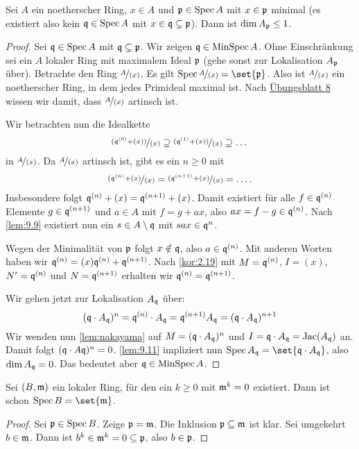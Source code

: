 \documentclass[12pt,a4paper]{scrartcl}
\theoremstyle{cplain}
\theoremstyle{cdef}
\begin{document}
\begin{satz} \label{thm:krulls hauptidealsatz}
	Sei $A$ ein noetherscher Ring, $x\in A$ und $\mathfrak{p}\in\operatorname{Spec} A$ mit $x\in\mathfrak{p}$ minimal (es existiert also kein $\mathfrak{q} \in\operatorname{Spec} A$ mit $x\in\mathfrak{q}\subsetneq \mathfrak{p}$). Dann ist $\dim A_{\mathfrak{p}}\le 1$.
\end{satz}
\begin{proof}
	Sei $\mathfrak{q}\in \operatorname{Spec} A$ mit $\mathfrak{q}\subsetneq \mathfrak{p}$. Wir zeigen $\mathfrak{q}\in \operatorname{MinSpec} A$. Ohne Einschränkung sei ein $A$ lokaler Ring mit maximalem Ideal $\mathfrak{p}$ (gehe sonst zur Lokalisation $A_{\mathfrak{p}}$ über). Betrachte den Ring $\nicefrac{A}{(x)}$. Es gilt $\Spec \fak{A}{(x)} = \set{\fp}$. Also ist $\nicefrac{A}{(x)}$ ein noetherscher Ring, in dem jedes Primideal maximal ist. Nach \href{http://www.math.uni-bonn.de/ag/stroppel/Franzen_Algebra_1_Uebung/Blatt8.pdf}{Übungsblatt 8} wissen wir damit, dass $\nicefrac{A}{(x)}$ artinsch ist.
	
	Wir betrachten nun die Idealkette \[\nicefrac{(\mathfrak{q}^{(0)}+(x))}{(x)} \supseteq \nicefrac{(\mathfrak{q}^{(1)}+(x))}{(x)}\supseteq \dots \] in $\nicefrac{A}{(x)}$. Da $\nicefrac{A}{(x)}$ artinsch ist, gibt es ein $n\ge 0$ mit \[\nicefrac{(\mathfrak{q}^{(n)}+(x)}{(x)} = \nicefrac{(\mathfrak{q}^{(n+1)}+(x)}{(x)} = \dots .\]
	Insbesondere folgt $\mathfrak{q}^{(n)}+(x) = \mathfrak{q}^{(n+1)}+ (x)$. Damit existiert für alle $f \in \mathfrak{q}^{(n)}$ Elemente $g\in \mathfrak{q}^{(n+1)}$ und $a\in A$ mit $f = g+ax$, also $ax = f-g\in \mathfrak{q}^{(n)}$. Nach \cref{lem:9.9} existiert nun ein $s\in A\setminus \mathfrak{q}$ mit $sax\in\mathfrak{q}^n$.
	
	Wegen der Minimalität von $\mathfrak{p}$ folgt $x\notin \mathfrak{q}$, also $a\in\mathfrak{q}^{(n)}$. Mit anderen Worten haben wir $\mathfrak{q}^{(n)} = (x)\mathfrak{q}^{(n)}+ \mathfrak{q}^{(n+1)}$. Nach \cref{kor:2.19} mit $M=\mathfrak{q}^{(n)}$, $I=(x)$, $N'=\mathfrak{q}^{(n)}$ und $N=\mathfrak{q}^{(n+1)}$ erhalten wir $\mathfrak{q}^{(n)} = \mathfrak{q}^{(n+1)}$.
	
	Wir gehen jetzt zur Lokalisation $A_{\mathfrak{q}}$ über: \[(\mathfrak{q}\cdot A_{\mathfrak{q}})^n = \mathfrak{q}^{(n)} \cdot A_{\mathfrak{q}} = \mathfrak{q}^{(n+1)}A_{\mathfrak{q}} = (\mathfrak{q}\cdot A_{\mathfrak{q}})^{n+1}\]
	Wir wenden nun \cref{lem:nakayama} auf $M = (\mathfrak{q}\cdot A_{\mathfrak{q}})^n$ und $I = \mathfrak{q}\cdot A_{\mathfrak{q}} = \operatorname{Jac}(A_{\mathfrak{q}})$ an. Damit folgt $(\mathfrak{q}\cdot A\mathfrak{q})^n = 0$. \cref{lem:9.11} impliziert nun $\Spec A_{\fq} = \set{\fq\cdot A_{\fq}}$, also $\dim A_{\mathfrak{q}} = 0$. Das bedeutet aber $\mathfrak{q}\in\operatorname{MinSpec} A$.
\end{proof}
\begin{lem} \label{lem:9.11}
	Sei $(B, \mathfrak{m})$ ein lokaler Ring, für den ein $k\ge 0$ mit $\mathfrak{m}^k = 0$ existiert. Dann ist schon $\Spec B = \set{\fm}$.
\end{lem}
\begin{proof}
	Sei $\mathfrak{p}\in\operatorname{Spec} B$. Zeige $\mathfrak{p} = \mathfrak{m}$. Die Inklusion $\mathfrak{p}\subseteq \mathfrak{m}$ ist klar. Sei umgekehrt $b\in \mathfrak{m}$. Dann ist $b^k \in \mathfrak{m}^k = 0 \subseteq \mathfrak{p}$, also $b\in\mathfrak{p}$.
\end{proof}
\end{document}
